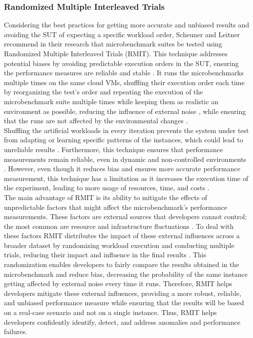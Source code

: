 \subsubsection{Randomized Multiple Interleaved Trials}
\label{sec:randomizedMultipleInterleavedTrials}
Considering the best practices for getting more accurate and unbiased results and avoiding the SUT of expecting a specific workload order, Scheuner and Leitner \cite{scheuner2018cloudBenchmarkingSuit} recommend in their research that microbenchmark suites be tested using Randomized Multiple Interleaved Trials (\ac{RMIT}). This technique addresses potential biases by avoiding predictable execution orders in the SUT, ensuring the performance measures are reliable and stable \cite{scheuner2018cloudBenchmarkingSuit, abedi2017conductingrepeatable}. It runs the microbenchmarks multiple times on the same cloud \ac{VM}s, shuffling their execution order each time by reorganizing the test's order and repeating the execution of the microbenchmark suite multiple times while keeping them as realistic an environment as possible, reducing the influence of external noise  \cite{japke2023earlymicrobenchmarkcatches,scheuner2018cloudBenchmarkingSuit}, while ensuring that the runs are not affected by the environmental changes \cite{abedi2017conductingrepeatable}. \\
Shuffling the artificial workloads in every iteration prevents the system under test from adapting or learning specific patterns of the instances, which could lead to unreliable results \cite{abedi2017conductingrepeatable, scheuner2018cloudBenchmarkingSuit}. Furthermore, this technique ensures that performance measurements remain reliable, even in dynamic and non-controlled environments \cite{abedi2017conductingrepeatable, scheuner2018cloudBenchmarkingSuit}. However, even though it reduces bias and ensures more accurate performance measurement, this technique has a limitation as it increases the execution time of the experiment, leading to more usage of resources, time, and costs  \cite{japke2023earlymicrobenchmarkcatches}. \\
The main advantage of \ac{RMIT} is its ability to mitigate the effects of unpredictable factors that might affect the microbenchmark's performance measurements. These factors are external sources that developers cannot control; the most common are resource and infrastructure fluctuations \cite{abedi2017conductingrepeatable}. To deal with these factors \ac{RMIT} distributes the impact of these external influences across a broader dataset by randomizing workload execution and conducting multiple trials, reducing their impact and influence in the final results \cite{abedi2017conductingrepeatable}. This randomization enables developers to fairly compare the results obtained in the microbenchmark and reduce bias, decreasing the probability of the same instance getting affected by external noise every time it runs. Therefore, \ac{RMIT} helps developers mitigate these external influences, providing a more robust, reliable, and unbiased performance measure while ensuring that the results will be based on a real-case scenario and not on a single instance. Thus, \ac{RMIT} helps developers confidently identify, detect, and address anomalies and performance failures.

